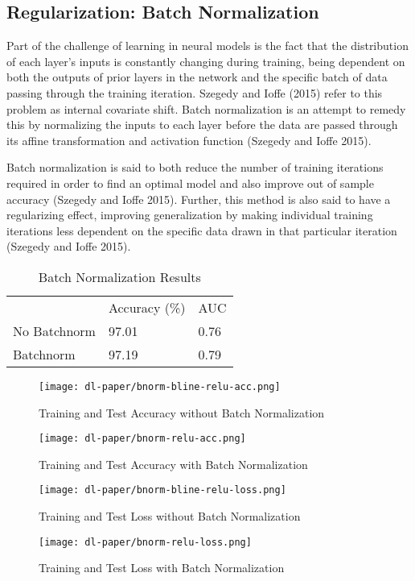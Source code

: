 \documentclass[12pt]{article}  %
\theoremstyle{definition}
\theoremstyle{remark}
\begin{document}
\subsection{Regularization: Batch Normalization}
\par Part of the challenge of learning in neural models is the fact that the distribution of each layer's inputs is constantly changing during training, being dependent on both the outputs of prior layers in the network and the specific batch of data passing through the training iteration. Szegedy and Ioffe (2015) refer to this problem as internal covariate shift. Batch normalization is an attempt to remedy this by normalizing the inputs to each layer before the data are passed through its affine transformation and activation function (Szegedy and Ioffe 2015).
\par Batch normalization is said to both reduce the number of training iterations required in order to find an optimal model and also improve out of sample accuracy (Szegedy and Ioffe 2015). Further, this method is also said to have a regularizing effect, improving generalization by making individual training iterations less dependent on the specific data drawn in that particular iteration (Szegedy and Ioffe 2015).  

\begin{table}[!h]
\centering
\caption{Batch Normalization Results}
\label{my-label}
\begin{tabular}{lll}
             & Accuracy (\%) & AUC  \\
No Batchnorm & 97.01         & 0.76 \\
Batchnorm    & 97.19         & 0.79
\end{tabular}
\end{table}

\begin{figure}[!h]
  \texttt{[image: dl-paper/bnorm-bline-relu-acc.png]}
  \caption{Training and Test Accuracy without Batch Normalization}\label{no-bn-acc}
\endminipage\hfill
{}
  \texttt{[image: dl-paper/bnorm-relu-acc.png]}
  \caption{Training and Test Accuracy with Batch Normalization}\label{bn-acc}
\endminipage\hfill
\end{figure}

\begin{figure}[!h]
  \texttt{[image: dl-paper/bnorm-bline-relu-loss.png]}
  \caption{Training and Test Loss without Batch Normalization}\label{no-bn-loss}
\endminipage\hfill
{}
  \texttt{[image: dl-paper/bnorm-relu-loss.png]}
  \caption{Training and Test Loss with Batch Normalization}\label{bn-loss}
\endminipage\hfill
\end{figure}
\end{document}
